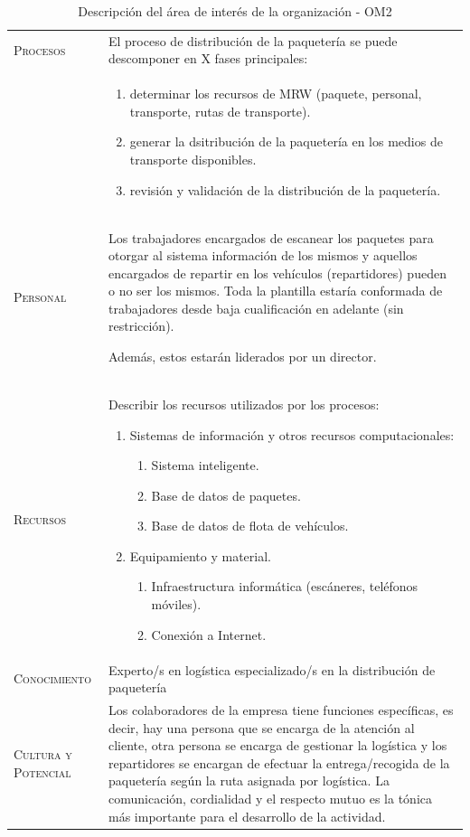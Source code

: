 \begin{table}[H]
\begin{tabularx}{\textwidth}{|l|X|}
\textsc{Procesos} & El proceso de distribución de la paquetería se puede descomponer en X fases principales: \\ &\begin{enumerate}
  \item determinar los recursos de MRW (paquete, personal, transporte, rutas de transporte).
  \item generar la dsitribución de la paquetería en los medios de transporte disponibles.
  \item revisión y validación de la distribución de la paquetería.
\end{enumerate} \\ \hline
\textsc{Personal} &  Los trabajadores encargados de escanear los paquetes para otorgar al sistema información de los mismos y aquellos encargados de repartir en los vehículos (repartidores) pueden o no ser los mismos. Toda la plantilla estaría conformada de trabajadores desde baja cualificación en adelante (sin restricción).

Además, estos estarán liderados por un director.
\\ \hline
\textsc{Recursos} &  Describir los recursos utilizados por los procesos:
\begin{enumerate}
    \item Sistemas de información y otros recursos computacionales:
    \begin{enumerate}
      \item Sistema inteligente.
      \item Base de datos de paquetes.
      \item Base de datos de flota de vehículos.
    \end{enumerate}
    \item Equipamiento y material.
    \begin{enumerate}
      \item Infraestructura informática (escáneres, teléfonos móviles).
      \item Conexión a Internet.
    \end{enumerate}
\end{enumerate}
\\ \hline
\textsc{Conocimiento} &  Experto/s en logística especializado/s en la distribución de paquetería \\ \hline
\textsc{Cultura y Potencial} &  Los colaboradores de la empresa tiene funciones específicas, es decir, hay una persona que se encarga de la atención al cliente, otra persona se encarga de gestionar la logística y los repartidores se encargan de efectuar la entrega/recogida de la paquetería según la ruta asignada por logística. La comunicación, cordialidad y el respecto mutuo es la tónica más importante para el desarrollo de la actividad.\\ \hline
\end{tabularx}
  \caption{\label{tab:OM2}Descripción del área de interés de la organización - OM2}
\end{table}
